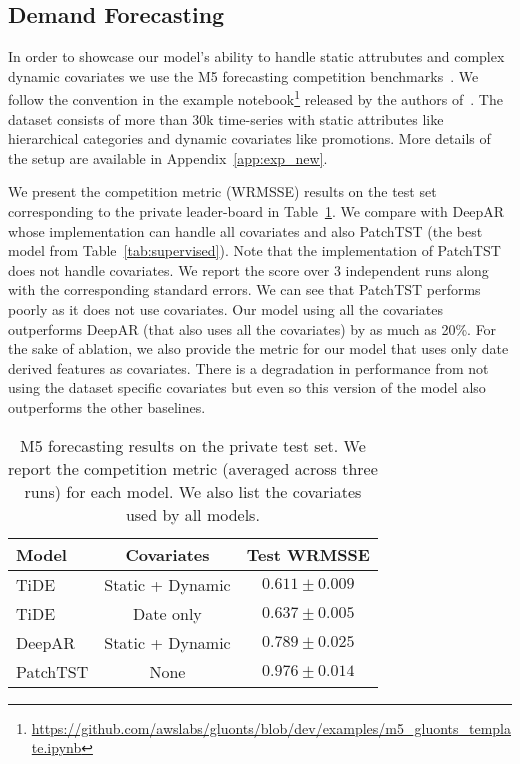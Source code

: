 \documentclass[10pt]{article} \usepackage[accepted]{tmlr}
\theoremstyle{plain}
\theoremstyle{definition}
\theoremstyle{remark}
\newcommand{\rev}[1]{#1}
\begin{document}
\subsection{Demand Forecasting}
\label{sec:m5}
\rev{
In order to showcase our model's ability to handle static attrubutes and complex dynamic covariates we use the M5 forecasting competition benchmarks~\citep{makridakis2022m5}. We follow the convention in the example notebook\footnote{\url{https://github.com/awslabs/gluonts/blob/dev/examples/m5_gluonts_template.ipynb}} released by the authors of~\citep{alexandrov2020gluonts}. The dataset consists of more than 30k time-series with static attributes like hierarchical categories and dynamic covariates like promotions. More details of the setup are available in Appendix~\ref{app:exp_new}.

 We present the competition metric (WRMSSE) results on the test set corresponding to the private leader-board in Table~\ref{tab:m5}. We compare with DeepAR~\citep{salinas2020deepar} whose implementation can handle all covariates and also PatchTST (the best model from Table~\ref{tab:supervised}). Note that the implementation of PatchTST~\citep{nie2022time} does not handle covariates. We report the score over 3 independent runs along with the corresponding standard errors. We can see that PatchTST performs poorly as it does not use covariates. Our model using all the covariates outperforms DeepAR (that also uses all the covariates) by as much as 20\%. For the sake of ablation, we also provide the metric for our model that uses only date derived features as covariates. There is a degradation in performance from not using the dataset specific covariates but even so this version of the model also outperforms the other baselines.


\begin{table}[!ht]
    \centering
    \begin{tabular}{l|c|c}
\toprule 
Model & Covariates & Test WRMSSE \\ 
\midrule 
TiDE & Static + Dynamic & $\mathbf{0.611 \pm 0.009}$ \\ 
TiDE & Date only & $0.637 \pm 0.005$ \\ 
DeepAR & Static + Dynamic & $0.789 \pm 0.025$ \\ 
PatchTST & None & $0.976 \pm 0.014$ \\ 
\bottomrule
\end{tabular}
    \caption{\rev{M5 forecasting results on the private test set. We report the competition metric (averaged across three runs) for each model. We also list the covariates used by all models.}}
    \label{tab:m5}
\end{table}

}
\end{document}
